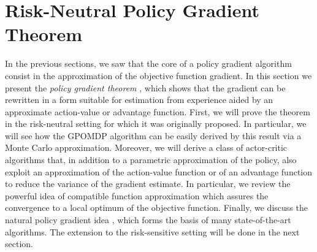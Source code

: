 \section{Risk-Neutral Policy Gradient Theorem}
In the previous sections, we saw that the core of a policy gradient algorithm consist in the approximation of the objective function gradient. In this section we present the \emph{policy gradient theorem} \cite{sutton1999policy}, which shows that the gradient can be rewritten in a form suitable for estimation from experience aided by an approximate action-value or advantage function. First, we will prove the theorem in the risk-neutral setting for which it was originally proposed. In particular, we will see how the GPOMDP algorithm can be easily derived by this result via a Monte Carlo approximation. Moreover, we will derive a class of actor-critic algorithms \cite{konda1999actor} that, in addition to a parametric approximation of the policy, also exploit an approximation of the action-value function or of an advantage function to reduce the variance of the gradient estimate. In particular, we review the powerful idea of compatible function approximation \cite{sutton1999policy} which assures the convergence to a local optimum of the objective function. Finally, we discuss the natural policy gradient idea \cite{kakade2001natural}, which forms the basis of many state-of-the-art algorithms. The extension to the risk-sensitive setting will be done in the next section. 

